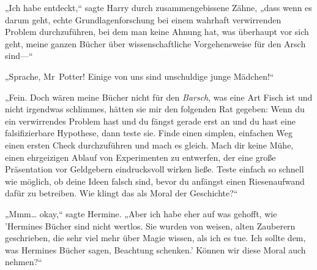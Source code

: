 „Ich habe entdeckt,“ sagte Harry durch zusammengebissene Zähne, „dass wenn es darum geht, echte Grundlagenforschung bei einem wahrhaft verwirrenden Problem durchzuführen, bei dem man keine Ahnung hat, was überhaupt vor sich geht, meine ganzen Bücher über wissenschaftliche Vorgehensweise für den Arsch sind—“

„Sprache, Mr~Potter! Einige von uns sind unschuldige junge Mädchen!“

„Fein. Doch wären meine Bücher nicht für den \emph{Barsch}, was eine Art Fisch ist und nicht irgendwas schlimmes, hätten sie mir den folgenden Rat gegeben: Wenn du ein verwirrendes Problem hast und du fängst gerade erst an und du hast eine falsifizierbare Hypothese, dann teste sie. Finde einen simplen, einfachen Weg einen ersten Check durchzuführen und mach es gleich. Mach dir keine Mühe, einen ehrgeizigen Ablauf von Experimenten zu entwerfen, der eine große Präsentation vor Geldgebern eindrucksvoll wirken ließe. Teste einfach so schnell wie möglich, ob deine Ideen falsch sind, bevor du anfängst einen Riesenaufwand dafür zu betreiben. Wie klingt das als Moral der Geschichte?“

„Mmm… okay,“ sagte Hermine. „Aber ich habe eher auf was gehofft, wie 'Hermines Bücher sind nicht wertlos. Sie wurden von weisen, alten Zauberern geschrieben, die sehr viel mehr über Magie wissen, als ich es tue. Ich sollte dem, was Hermines Bücher sagen, Beachtung schenken.' Können wir diese Moral auch nehmen?“

